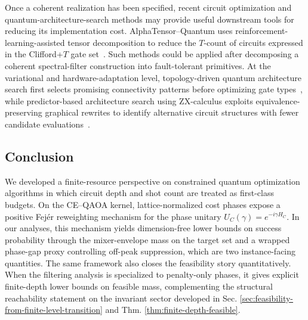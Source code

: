 \documentclass[a4paper,unpublished,onecolumn,11pt]{quantumarticle}
\theoremstyle{definition}
\theoremstyle{remark}
\begin{document}
Once a coherent realization has been specified, recent circuit
optimization and quantum-architecture-search methods may provide
useful downstream tools for reducing its implementation cost.
AlphaTensor--Quantum uses reinforcement-learning-assisted tensor
decomposition to reduce the \(T\)-count of circuits expressed in the
Clifford+\(T\) gate set~\cite{RuizEtAl2025AlphaTensor}. Such methods
could be applied after decomposing a coherent spectral-filter
construction into fault-tolerant primitives. At the variational and
hardware-adaptation level, topology-driven quantum architecture search
first selects promising connectivity patterns before optimizing gate
types~\cite{SuEtAl2025TopologyQAS}, while predictor-based architecture
search using ZX-calculus exploits equivalence-preserving graphical
rewrites to identify alternative circuit structures with fewer
candidate evaluations~\cite{LiEtAl2025ZXQAS}.



\subsection{Conclusion}

We developed a finite-resource perspective on constrained quantum optimization algorithms in which circuit depth and shot count are treated as first-class budgets. On the CE--QAOA kernel, lattice-normalized cost phases expose a positive Fej\'er reweighting mechanism for the phase unitary $U_C(\gamma)=e^{-i\gamma H_C}$. In our analyses, this mechanism yields dimension-free lower bounds on success probability through the mixer-envelope mass on the target set and a wrapped phase-gap proxy controlling off-peak suppression, which are two instance-facing quantities. The same framework also closes the feasibility story quantitatively. When the filtering analysis is specialized to penalty-only phases, it gives explicit finite-depth lower bounds on feasible mass, complementing the structural reachability statement on the invariant sector developed in Sec. \ref{sec:feasibility-from-finite-level-transition} and Thm. \ref{thm:finite-depth-feasible}.
\end{document}
